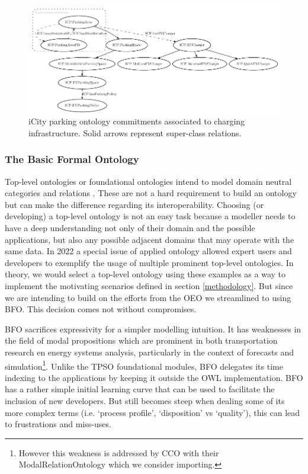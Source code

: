 \begin{figure}[h]
    \centering
    \includegraphics{images/PARKING.pdf}
    \caption{iCity parking ontology commitments associated to charging infrastructure. Solid arrows represent super-class relations.}
    \label{parkingfig}
\end{figure}

\subsubsection{The Basic Formal Ontology}
\label{upperlevel}

Top-level ontologies or foundational ontologies intend to model domain neutral
categories and relations \cite{Arp.2015}. These are not a hard requirement to
build an ontology but can make the difference regarding its interoperability.
Choosing (or developing) a top-level ontology is not an easy task because a
modeller needs to have a deep understanding not only of their domain and the
possible applications, but also any possible adjacent domains that may operate
with the same data. In 2022 a special issue of applied ontology
\cite{Borgo.2022} allowed expert users and developers to exemplify the usage of
multiple prominent top-level ontologies. In theory, we would select a top-level
ontology using these examples as a way to implement the motivating scenarios
defined in section \ref{methodology}. But since we are intending to build on
the efforts from the OEO we streamlined to using BFO. This decision comes not
without compromises. 

BFO sacrifices expressivity for a simpler modelling intuition. It has
weaknesses in the field of modal propositions which are prominent in both
transportation research en energy systems analysis, particularly in the context
of forecasts and simulation\footnote{However this weakness is addressed by CCO
with their ModalRelationOntology which we consider importing. }. Unlike the
TPSO foundational modules, BFO delegates its time indexing to the applications
by keeping it outside the OWL implementation. BFO has a rather simple initial
learning curve that can be used to facilitate the inclusion of new developers.
But still becomes steep when dealing some of its more complex terms (i.e.
`process profile', `disposition' vs `quality'), this can lead to frustrations
and miss-uses.


